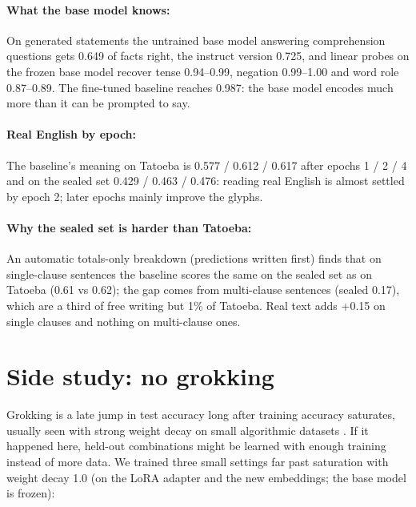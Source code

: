 \documentclass{article} %
\begin{document}
\paragraph{What the base model knows:} On generated statements the untrained base model answering comprehension
questions gets 0.649 of facts right, the instruct version 0.725, and linear probes on the frozen base model recover
tense 0.94--0.99, negation 0.99--1.00 and word role 0.87--0.89. The fine-tuned baseline reaches 0.987: the base model
encodes much more than it can be prompted to say.

\paragraph{Real English by epoch:} The baseline's meaning on Tatoeba is 0.577 / 0.612 / 0.617 after epochs 1 / 2 / 4
and on the sealed set 0.429 / 0.463 / 0.476: reading real English is almost settled by epoch 2; later epochs mainly
improve the glyphs.

\paragraph{Why the sealed set is harder than Tatoeba:} An automatic totals-only breakdown (predictions written first)
finds that on single-clause sentences the baseline scores the same on the sealed set as on Tatoeba (0.61 vs 0.62);
the gap comes from multi-clause sentences (sealed 0.17), which are a third of free writing but 1\% of Tatoeba.
Real text adds +0.15 on single clauses and nothing on multi-clause ones.

\section{Side study: no grokking}\label{app:grok}

Grokking is a late jump in test accuracy long after training accuracy saturates, usually seen with strong weight
decay on small algorithmic datasets \citep{power2022grokking}. If it happened here, held-out combinations might be
learned with enough training instead of more data. We trained three small settings far past saturation with weight
decay 1.0 (on the LoRA adapter and the new embeddings; the base model is frozen):

\begin{center}\small
{}
\end{center}
\end{document}
